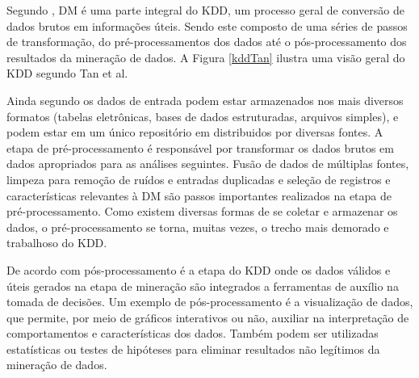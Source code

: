 Segundo , DM é uma parte integral do KDD, um
processo geral de conversão de dados brutos em informações úteis. Sendo este
composto de uma séries de passos de transformação, do pré-processamentos dos
dados até o pós-processamento dos resultados da mineração de dados. A Figura
\ref{kddTan} ilustra uma visão geral do KDD segundo Tan et al.


Ainda segundo  os dados de entrada podem estar
armazenados nos mais diversos formatos (tabelas eletrônicas, bases de dados
estruturadas, arquivos simples), e podem estar em um único repositório em
distribuidos por diversas fontes. A etapa de pré-processamento é responsável por
transformar os dados brutos em dados apropriados para as análises seguintes.
Fusão de dados de múltiplas fontes, limpeza para remoção de ruídos e entradas
duplicadas e seleção de registros e características relevantes à DM são passos
importantes realizados na etapa de pré-processamento. Como existem diversas
formas de se coletar e armazenar os dados, o pré-processamento se torna, muitas
vezes, o trecho mais demorado e trabalhoso do KDD.

De acordo com  pós-processamento é a etapa do KDD
onde os dados válidos e úteis gerados na etapa de mineração são integrados a
ferramentas de auxílio na tomada de decisões. Um exemplo de pós-processamento é
a visualização de dados, que permite, por meio de gráficos interativos ou não,
auxiliar na interpretação de comportamentos e características dos dados. Também
podem ser utilizadas estatísticas ou testes de hipóteses para eliminar
resultados não legítimos da mineração de dados.
